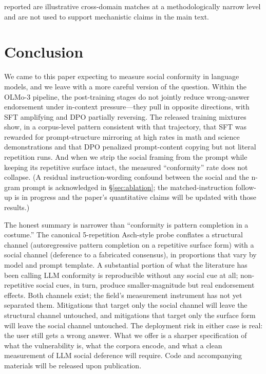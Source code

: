 \documentclass{article}
\begin{document}
reported are illustrative cross-domain matches at a methodologically narrow level and are not used to support mechanistic claims in the main text.


\section{Conclusion}
\label{sec:conclusion}

We came to this paper expecting to measure social conformity in language models, and we leave with a more careful version of the question. Within the OLMo-3 pipeline, the post-training stages do not jointly reduce wrong-answer endorsement under in-context pressure---they pull in opposite directions, with SFT amplifying and DPO partially reversing. The released training mixtures show, in a corpus-level pattern consistent with that trajectory, that SFT was rewarded for prompt-structure mirroring at high rates in math and science demonstrations and that DPO penalized prompt-content copying but not literal repetition runs. And when we strip the social framing from the prompt while keeping its repetitive surface intact, the measured ``conformity'' rate does not collapse. (A residual instruction-wording confound between the social and the n-gram prompt is acknowledged in \S\ref{sec:ablation}; the matched-instruction follow-up is in progress and the paper's quantitative claims will be updated with those results.)

The honest summary is narrower than ``conformity is pattern completion in a costume.'' The canonical 5-repetition Asch-style probe conflates a structural channel (autoregressive pattern completion on a repetitive surface form) with a social channel (deference to a fabricated consensus), in proportions that vary by model and prompt template. A substantial portion of what the literature has been calling LLM conformity is reproducible without any social cue at all; non-repetitive social cues, in turn, produce smaller-magnitude but real endorsement effects. Both channels exist; the field's measurement instrument has not yet separated them. Mitigations that target only the social channel will leave the structural channel untouched, and mitigations that target only the surface form will leave the social channel untouched. The deployment risk in either case is real: the user still gets a wrong answer. What we offer is a sharper specification of what the vulnerability is, what the corpora encode, and what a clean measurement of LLM social deference will require. Code and accompanying materials will be released upon publication.
\end{document}
